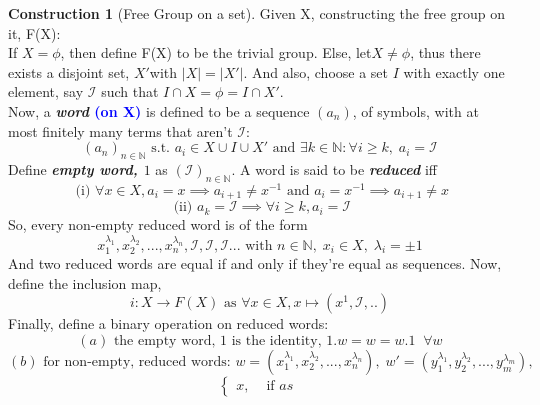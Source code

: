 \documentclass{article}
\theoremstyle{definition}
\theoremstyle{definition}
\newtheorem{construction}{Construction}[theorem]
\begin{document}
\begin{construction}[Free Group on a set]
	Given X, constructing the free group on it, F(X):\\
	If $X=\phi$, then define F(X) to be the trivial group. Else, let$X\neq \phi$, thus there exists a disjoint set, $X'$with $|X|=|X'|$.
	And also, choose a set $I$ with exactly one element, say $\mathcal{I} $ such that $I\cap X=\phi =I\cap X'$.\\
	Now, a \textbf{ \textit{word} \textcolor{blue}{(on X)}} is defined to be a sequence $(a_n)$, of symbols,
	with at most finitely many terms that aren't $\mathcal{I}$:
	\[ (a_n)_{n\in \mathbb{N}} \text{ s.t. } a_i \in X \cup I \cup X'
	\text{ and } \exists k \in \mathbb{N}: \forall i \geq k,\; a_i=\mathcal{I}   \]
	Define \textbf{\textit{empty word, $1$}} as $(\mathcal{I})_{n \in \mathbb{N}}$.
	A word is said to be \textbf{\textit{reduced}} iff
	\[ \text{ (i) }   \forall x \in X , a_i=x \implies a_{i+1} \neq x^{-1}
			\text{ and }  a_i = x^{-1} \implies a_{i+1} \neq x \]
			\[ \text{ (ii) } a_k=\mathcal{I} \implies \forall i \geq k , a_i=\mathcal{I} \]
			So, every non-empty reduced word is of the form
			\[ x_1^{\lambda_1},x_2^{\lambda_2},...,x_n^{\lambda_n},\mathcal{I},\mathcal{I},\mathcal{I}...
			\text{ with } n \in \mathbb{N} ,\; x_i \in X ,\; \lambda_i = \pm 1 \]
			And two reduced words are equal if and only if they're equal as sequences.
Now, define the inclusion map,
\[ i:X \rightarrow F(X) \text{ as } \forall x \in X, x \mapsto (x^1,\mathcal{I},.. ) \]
Finally, define a binary operation on reduced words:
\[ (a) \text{ the empty word, 1 is the identity, } 1.w=w=w.1 \; \;\forall w \]
\[ (b) \text{ for non-empty, reduced words: } w=(x_1^{\lambda_1},x_2^{\lambda_2},...,x_n^{\lambda_n}), \;
w' =(y_1^{\lambda_1},y_2^{\lambda_2},...,y_m^{\lambda_m}), \]
\[ \begin{cases}
	x, &\text{ if }as\

\end{cases} \]
\end{construction}
\end{document}

